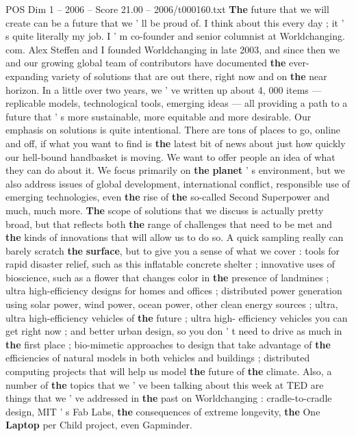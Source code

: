 \begin{textsample}{POS Dim 1 – 2006 – Score 21.00 – 2006/t000160.txt}  \label{ex:f1_pos_012}
\textbf{The} future that we will create can be a future that we ' ll be proud of.
I think about this every day ; it ' s quite literally my job.
I ' m co-founder and senior columnist at Worldchanging. com.
Alex Steffen and I founded Worldchanging in late 2003, and since then we and our growing global team of contributors have documented \textbf{the} ever-expanding variety of solutions that are out there, right now and on \textbf{the} near horizon.
In a little over two years, we ' ve written up about 4, 000 items — replicable models, technological tools, emerging ideas — all providing a path to a future that ' s more sustainable, more equitable and more desirable.
Our emphasis on solutions is quite intentional.
There are tons of places to go, online and off, if what you want to find is \textbf{the} latest bit of news about just how quickly our hell-bound handbasket is moving.
We want to offer people an idea of what they can do about it.
We focus primarily on \textbf{the} \textbf{planet} ' s environment, but we also address issues of global development, international conflict, responsible use of emerging technologies, even \textbf{the} rise of \textbf{the} so-called Second Superpower and much, much more. \textbf{The} scope of solutions that we discuss is actually pretty broad, but that reflects both \textbf{the} range of challenges that need to be met and \textbf{the} kinds of innovations that will allow us to do so.
A quick sampling really can barely scratch \textbf{the} \textbf{surface}, but to give you a sense of what we cover : tools for rapid disaster relief, such as this inflatable concrete shelter ; innovative uses of bioscience, such as a flower that changes color in \textbf{the} presence of landmines ; ultra high-efficiency designs for homes and offices ; distributed power generation using solar power, wind power, ocean power, other clean energy sources ; ultra, ultra high-efficiency vehicles of \textbf{the} future ; ultra high- efficiency vehicles you can get right now ; and better urban design, so you don ' t need to drive as much in \textbf{the} first place ; bio-mimetic approaches to design that take advantage of \textbf{the} efficiencies of natural models in both vehicles and buildings ; distributed computing projects that will help us model \textbf{the} future of \textbf{the} climate.
Also, a number of \textbf{the} topics that we ' ve been talking about this week at TED are things that we ' ve addressed in \textbf{the} past on Worldchanging : cradle-to-cradle design, MIT ' s Fab Labs, \textbf{the} consequences of extreme longevity, \textbf{the} One \textbf{Laptop} per Child project, even Gapminder.

\end{textsample}
